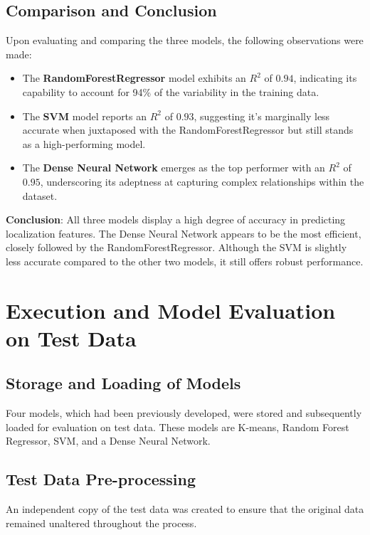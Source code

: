 \documentclass[conference]{IEEEtran}
\begin{document}
\subsection{Comparison and Conclusion}

Upon evaluating and comparing the three models, the following observations were made:
\begin{itemize}
    \item The \textbf{RandomForestRegressor} model exhibits an $R^2$ of $0.94$, indicating its capability to account for 94\% of the variability in the training data.
    \item The \textbf{SVM} model reports an $R^2$ of $0.93$, suggesting it's marginally less accurate when juxtaposed with the RandomForestRegressor but still stands as a high-performing model.
    \item The \textbf{Dense Neural Network} emerges as the top performer with an $R^2$ of $0.95$, underscoring its adeptness at capturing complex relationships within the dataset.
\end{itemize}

\textbf{Conclusion}: All three models display a high degree of accuracy in predicting localization features. The Dense Neural Network appears to be the most efficient, closely followed by the RandomForestRegressor. Although the SVM is slightly less accurate compared to the other two models, it still offers robust performance.

\section{Execution and Model Evaluation on Test Data}

\subsection{Storage and Loading of Models}

Four models, which had been previously developed, were stored and subsequently loaded for evaluation on test data. These models are K-means, Random Forest Regressor, SVM, and a Dense Neural Network.

\subsection{Test Data Pre-processing}

An independent copy of the test data was created to ensure that the original data remained unaltered throughout the process.
\end{document}
